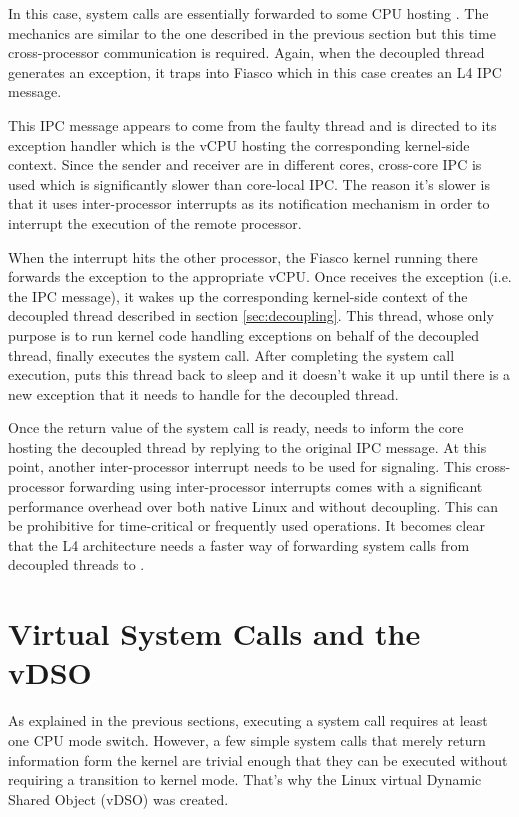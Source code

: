 In this case, system calls are essentially forwarded to some CPU hosting
\llinux. The mechanics are similar to the one described in the previous section
but this time cross-processor communication is required. Again, when the
decoupled thread generates an exception, it traps into Fiasco which in this
case creates an L4 IPC message.

This IPC message appears to come from the faulty thread and is directed to its
exception handler which is the vCPU hosting the corresponding kernel-side
context. Since the sender and receiver are in different cores, cross-core IPC
is used which is significantly slower than core-local IPC. The reason it's
slower is that it uses inter-processor interrupts as its notification mechanism
in order to interrupt the execution of the remote processor.

When the interrupt hits the other processor, the Fiasco kernel running there
forwards the exception to the appropriate vCPU. Once \llinux receives the
exception (i.e. the IPC message), it wakes up the corresponding kernel-side
context of the decoupled thread described in section \ref{sec:decoupling}. This
thread, whose only purpose is to run \llinux kernel code handling exceptions on
behalf of the decoupled thread, finally executes the system call. After
completing the system call execution, \llinux puts this thread back to sleep
and it doesn't wake it up until there is a new exception that it needs to
handle for the decoupled thread.

Once the return value of the system call is ready, \llinux needs to inform the
core hosting the decoupled thread by replying to the original IPC message. At
this point, another inter-processor interrupt needs to be used for signaling.
This cross-processor forwarding using inter-processor interrupts comes with a
significant performance overhead over both native Linux and \llinux without
decoupling. This can be prohibitive for time-critical or frequently used
operations. It becomes clear that the L4 architecture needs a faster way of
forwarding system calls from decoupled threads to \llinux.

\section{Virtual System Calls and the vDSO}

As explained in the previous sections, executing a system call requires at
least one CPU mode switch. However, a few simple system calls that merely
return information form the kernel are trivial enough that they can be executed
without requiring a transition to kernel mode. That's why the Linux virtual
Dynamic Shared Object (vDSO) \cite{vdso} was created.

